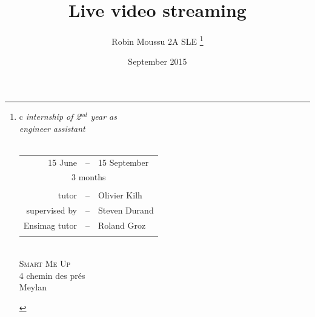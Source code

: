 \documentclass[a4paper,11pt]{custom}
\newcommand{\smu}{\textsc{Smart Me Up}\xspace}
\begin{document}



\title{
  Live video streaming
}
\author{
  Robin Moussu 2A SLE
  \thanks{
  \begin{tabular}{c}
    \textit{internship of 2$^{nd}$ year as}\\
    \textit{engineer assistant}\\
    \vspace{2em}\\
    \begin{tabular}{rcl}
      15 June &--& 15 September\\
      \multicolumn{3}{c}{3 months}\\
      \\
      tutor &--& Olivier Kilh \\
      supervised by &--& Steven Durand \\
      Ensimag tutor &--& Roland Groz\\
      \\
    \end{tabular}
    \vspace{2em}\\
    \smu\\
    4 chemin des prés\\
    Meylan\\
  \end{tabular}
  }
}
\date{
  September 2015
}
\maketitle

\end{document}
